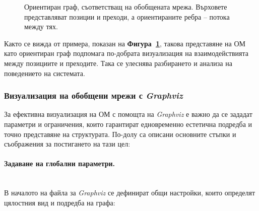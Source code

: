 \begin{figure}[h!]
	\centering
	\begin{varwidth}{\textwidth}
		\centering
		
		\captionsetup{width=0.6\linewidth, justification=centering}
		\caption{Ориентиран граф, съответстващ на обобщената мрежа. Върховете представляват позиции и преходи, а ориентираните ребра – потока между тях.}
		\label{fig:gen-network-graph}
	\end{varwidth}
\end{figure}

Както се вижда от примера, показан на \textbf{Фигура~\ref{fig:gen-network-graph}}, такова представяне на ОМ като ориентиран граф подпомага по-добрата визуализация на взаимодействията между позициите и преходите. Така се улеснява разбирането и анализа на поведението на системата.

\subsubsection{Визуализация на обобщени мрежи с \textit{Graphviz}}

\hspace*{2.5em}За ефективна визуализация на ОМ с помощта на \textit{Graphviz} е важно да се зададат параметри и ограничения, които гарантират едновременно естетична подредба и точно представяне на структурата. По-долу са описани основните стъпки и съображения за постигането на тази цел:

\paragraph{Задаване на глобални параметри.}
\mbox{}\\
В началото на файла за \textit{Graphviz} се дефинират общи настройки, които определят цялостния вид и подредба на графа:

